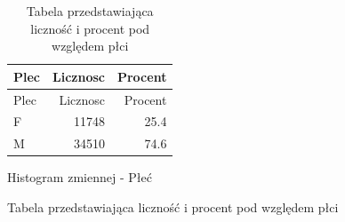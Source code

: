 \documentclass[
  letterpaper,
  DIV=11,
  numbers=noendperiod]{scrartcl}
\begin{document}
\begin{figure}

\begin{minipage}[t]{0.50\linewidth}

{\centering 


\caption{Histogram zmiennej - Płeć}

}

\end{minipage}%
%
\begin{minipage}[t]{0.50\linewidth}

{\centering 

\begin{longtable}[]{@{}lrr@{}}
\caption{Tabela przedstawiająca liczność i procent pod względem płci
}\tabularnewline
\toprule\noalign{}
Plec & Licznosc & Procent \\
\midrule\noalign{}
\endfirsthead
\toprule\noalign{}
Plec & Licznosc & Procent \\
\midrule\noalign{}
\endhead
\bottomrule\noalign{}
\endlastfoot
F & 11748 & 25.4 \\
M & 34510 & 74.6 \\
\end{longtable}

}

\end{minipage}%
\newline
\begin{minipage}[t]{0.50\linewidth}

{\centering 

Histogram zmiennej - Płeć

}

\end{minipage}%

\end{figure}
\end{document}
